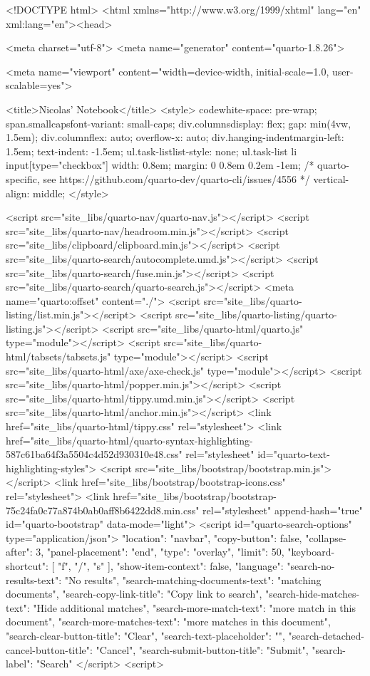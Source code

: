 <!DOCTYPE html>
<html xmlns="http://www.w3.org/1999/xhtml" lang="en" xml:lang="en"><head>

<meta charset="utf-8">
<meta name="generator" content="quarto-1.8.26">

<meta name="viewport" content="width=device-width, initial-scale=1.0, user-scalable=yes">


<title>Nicolas’ Notebook</title>
<style>
code{white-space: pre-wrap;}
span.smallcaps{font-variant: small-caps;}
div.columns{display: flex; gap: min(4vw, 1.5em);}
div.column{flex: auto; overflow-x: auto;}
div.hanging-indent{margin-left: 1.5em; text-indent: -1.5em;}
ul.task-list{list-style: none;}
ul.task-list li input[type="checkbox"] {
  width: 0.8em;
  margin: 0 0.8em 0.2em -1em; /* quarto-specific, see https://github.com/quarto-dev/quarto-cli/issues/4556 */ 
  vertical-align: middle;
}
</style>


<script src="site_libs/quarto-nav/quarto-nav.js"></script>
<script src="site_libs/quarto-nav/headroom.min.js"></script>
<script src="site_libs/clipboard/clipboard.min.js"></script>
<script src="site_libs/quarto-search/autocomplete.umd.js"></script>
<script src="site_libs/quarto-search/fuse.min.js"></script>
<script src="site_libs/quarto-search/quarto-search.js"></script>
<meta name="quarto:offset" content="./">
<script src="site_libs/quarto-listing/list.min.js"></script>
<script src="site_libs/quarto-listing/quarto-listing.js"></script>
<script src="site_libs/quarto-html/quarto.js" type="module"></script>
<script src="site_libs/quarto-html/tabsets/tabsets.js" type="module"></script>
<script src="site_libs/quarto-html/axe/axe-check.js" type="module"></script>
<script src="site_libs/quarto-html/popper.min.js"></script>
<script src="site_libs/quarto-html/tippy.umd.min.js"></script>
<script src="site_libs/quarto-html/anchor.min.js"></script>
<link href="site_libs/quarto-html/tippy.css" rel="stylesheet">
<link href="site_libs/quarto-html/quarto-syntax-highlighting-587c61ba64f3a5504c4d52d930310e48.css" rel="stylesheet" id="quarto-text-highlighting-styles">
<script src="site_libs/bootstrap/bootstrap.min.js"></script>
<link href="site_libs/bootstrap/bootstrap-icons.css" rel="stylesheet">
<link href="site_libs/bootstrap/bootstrap-75c24fa0c77a874b0ab0aff8b6422dd8.min.css" rel="stylesheet" append-hash="true" id="quarto-bootstrap" data-mode="light">
<script id="quarto-search-options" type="application/json">{
  "location": "navbar",
  "copy-button": false,
  "collapse-after": 3,
  "panel-placement": "end",
  "type": "overlay",
  "limit": 50,
  "keyboard-shortcut": [
    "f",
    "/",
    "s"
  ],
  "show-item-context": false,
  "language": {
    "search-no-results-text": "No results",
    "search-matching-documents-text": "matching documents",
    "search-copy-link-title": "Copy link to search",
    "search-hide-matches-text": "Hide additional matches",
    "search-more-match-text": "more match in this document",
    "search-more-matches-text": "more matches in this document",
    "search-clear-button-title": "Clear",
    "search-text-placeholder": "",
    "search-detached-cancel-button-title": "Cancel",
    "search-submit-button-title": "Submit",
    "search-label": "Search"
  }
}</script>
<script>

